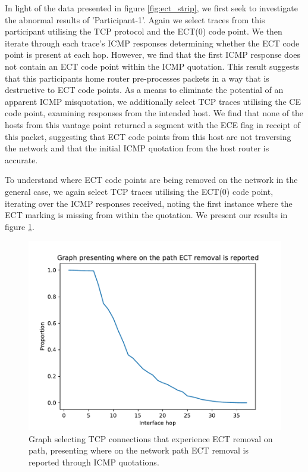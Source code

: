 \documentclass{l4proj}
\begin{document}
In light of the data presented in figure \ref{fig:ect_strip}, we first seek to investigate the abnormal results of 'Participant-1'. Again we select traces from this participant utilising the TCP protocol and the ECT(0) code point. We then iterate through each trace's ICMP responses determining whether the ECT code point is present at each hop. However, we find that the first ICMP response does not contain an ECT code point within the ICMP quotation. This result suggests that this participants home router pre-processes packets in a way that is destructive to ECT code points. As a means to eliminate the potential of an apparent ICMP misquotation, we additionally select TCP traces utilising the CE code point, examining responses from the intended host. We find that none of the hosts from this vantage point returned a segment with the ECE flag in receipt of this packet, suggesting that ECT code points from this host are not traversing the network and that the initial ICMP quotation from the host router is accurate.

To understand where ECT code points are being removed on the network in the general case, we again select TCP traces utilising the ECT(0) code point, iterating over the ICMP responses received, noting the first instance where the ECT marking is missing from within the quotation. We present our results in figure \ref{fig:tcppreserve}.

\begin{figure}[H]
    \centering
    \includegraphics[scale=0.70]{dissertation/images/preservetcp.pdf}
    \caption{Graph selecting TCP connections that experience ECT removal on path, presenting where on the network path ECT removal is reported through ICMP quotations.}
    \label{fig:tcppreserve}
\end{figure}
\end{document}
